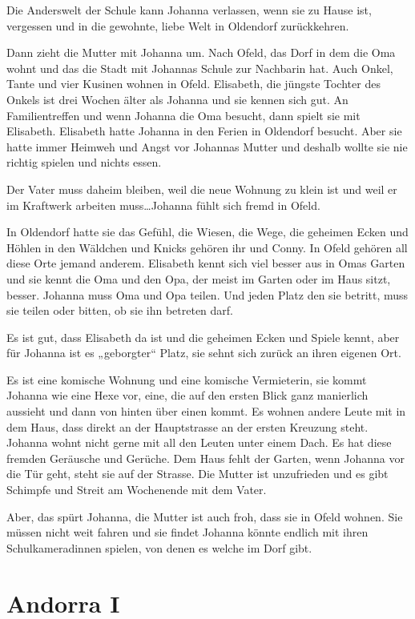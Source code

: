 Die Anderswelt der Schule kann Johanna verlassen, wenn sie zu Hause ist, vergessen und in die gewohnte, liebe Welt in Oldendorf  zurückkehren.


\sterne


Dann zieht die Mutter mit Johanna um. Nach Ofeld, das Dorf in dem die Oma wohnt und das die Stadt mit Johannas Schule zur Nachbarin hat. Auch Onkel, Tante und vier Kusinen wohnen in Ofeld. Elisabeth, die jüngste Tochter des Onkels ist drei Wochen älter als Johanna und sie kennen sich gut. An Familientreffen und wenn Johanna die Oma besucht, dann spielt sie mit Elisabeth. Elisabeth hatte Johanna in den Ferien in Oldendorf besucht. Aber sie hatte immer Heimweh und Angst vor Johannas Mutter und deshalb wollte sie nie richtig spielen und nichts essen.

Der Vater muss daheim bleiben, weil die neue Wohnung zu klein ist und weil er im Kraftwerk arbeiten muss\dots Johanna fühlt sich fremd in Ofeld.

In Oldendorf hatte sie das Gefühl, die Wiesen, die Wege, die geheimen Ecken und Höhlen in den Wäldchen und Knicks gehören ihr und Conny. In Ofeld gehören all diese Orte jemand anderem. Elisabeth kennt sich viel besser aus in Omas Garten und sie kennt die Oma und den Opa, der meist im Garten oder im Haus sitzt, besser. Johanna muss Oma und Opa teilen. Und jeden Platz den sie betritt, muss sie teilen oder bitten, ob sie ihn betreten darf.

Es ist gut, dass Elisabeth da ist und die geheimen Ecken und Spiele kennt, aber für Johanna ist es „geborgter“ Platz, sie sehnt sich zurück an ihren eigenen Ort.

Es ist eine komische Wohnung und eine komische Vermieterin, sie kommt Johanna wie eine Hexe vor, eine, die auf den ersten Blick ganz manierlich aussieht und dann von hinten über einen kommt. Es wohnen andere Leute mit in dem Haus, dass direkt an der Hauptstrasse an der ersten Kreuzung steht. Johanna wohnt nicht gerne mit all den Leuten unter einem Dach. Es hat diese fremden Geräusche und Gerüche. Dem Haus fehlt der Garten, wenn Johanna vor die Tür geht, steht sie auf der Strasse. Die Mutter ist unzufrieden und es gibt Schimpfe und Streit am Wochenende mit dem Vater. 

Aber, das spürt Johanna, die Mutter ist auch froh, dass sie in Ofeld wohnen. Sie müssen nicht weit fahren und sie findet Johanna könnte endlich mit ihren Schulkameradinnen spielen, von denen es welche im Dorf gibt. 


\section*{Andorra I}



